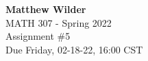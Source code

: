 \documentclass[12pt]{article}
\begin{document}
\pagestyle{fancy}
\fancyhf{}

\noindent \textbf{Matthew Wilder}\\MATH 307 - Spring 2022 \\
Assignment \#5 \\
Due Friday, 02-18-22, 16:00 CST \\


\end{document}

